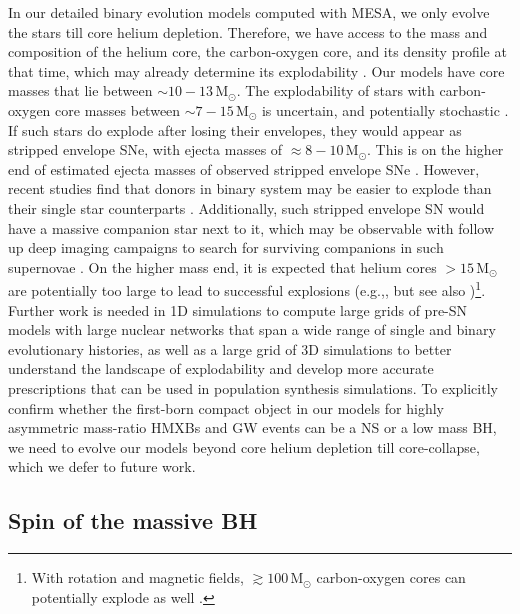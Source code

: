 \documentclass[linenumbers,trackchanges,twocolumn]{aastex701}
\newcommand{\Mdot}{\mathrm{M}_{\odot}}
\begin{document}
In our detailed binary evolution models computed with MESA, we only evolve the stars till core helium depletion. Therefore, we have access to the mass and composition of the helium core, the carbon-oxygen core, and its density profile at that time, which may already determine its explodability \citep[e.g.,][]{2025A&A...695A..71L}. Our models have core masses that lie between $\sim 10-13 \, \Mdot$. The explodability of stars with carbon-oxygen core masses between $\sim 7-15 \, \Mdot$ is uncertain, and potentially stochastic \citep[e.g.,][]{2025A&A...700A..20M}. If such stars do explode after losing their envelopes, they would appear as stripped envelope SNe, with ejecta masses of $\approx 8-10\,\Mdot$. This is on the higher end of estimated ejecta masses of observed stripped envelope SNe \citep{2016MNRAS.457..328L}. However, recent studies \citep[e.g.,][]{2021A&A...645A...5S,2021A&A...656A..58L,2021ApJ...916L...5V,2023ApJ...948..111F} find that donors in binary system may be easier to explode than their single star counterparts \citep[but see also][]{2024RNAAS...8..302K}. Additionally, such stripped envelope SN would have a massive companion star next to it, which may be observable with follow up deep imaging campaigns to search for surviving companions in such supernovae \citep[e.g.,][]{2017ApJ...842..125Z, 2026MNRAS.546f2208Z, 2026MNRAS.545f2163S}. On the higher mass end, it is expected that helium cores $> 15\, \Mdot$ are potentially too large to lead to successful explosions (e.g.,\citealp{Fryer_2012,Patton_2020,2025A&A...700A..20M}, but see also \citealp{2018MNRAS.477L..80K,2023ApJ...957...68B,2024ApJ...964L..16B,2025ApJ...987..164B})\footnote{With rotation and magnetic fields, $\gtrsim 100\,\Mdot$ carbon-oxygen cores can potentially explode as well \citep{2022ApJ...941..100S,2025arXiv250815887G}.}. Further work is needed in 1D simulations to compute large grids of pre-SN models with large nuclear networks that span a wide range of single and binary evolutionary histories, as well as a large grid of 3D simulations to better understand the landscape of explodability and develop more accurate prescriptions that can be used in population synthesis simulations. To explicitly confirm whether the first-born compact object in our models for highly asymmetric mass-ratio HMXBs and GW events can be a NS or a low mass BH, we need to evolve our models beyond core helium depletion till core-collapse, which we defer to future work.

\subsection{Spin of the massive BH} \label{spin}
\end{document}
